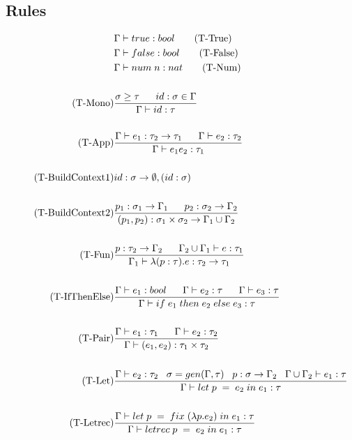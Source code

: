 \documentclass[10pt,a4paper,draft]{article}
\begin{document}
\begin{flushleft}
\subsection{Rules}
\begin{align*}
&\Gamma \vdash true : bool \tag{T-True} \\
&\Gamma \vdash false : bool \tag{T-False} \\
&\Gamma \vdash num \; n : nat \tag{T-Num} \\ \\
\tag{T-Mono}
&\frac{\sigma \geq \tau \longspace id:\sigma \in \Gamma}{\Gamma \vdash id:\tau}\\ \\
\tag{T-App}
&\frac{\Gamma \vdash e_{1}:\tau_{2} \rightarrow \tau_{1} \longspace \Gamma \vdash e_{2}:\tau_{2}}
{\Gamma \vdash e_{1}e_{2}:\tau_{1}} \\ \\
\tag{T-BuildContext1}
& id:\sigma \rightarrow \emptyset, (id:\sigma) \\ \\
\tag{T-BuildContext2}
&\frac{p_{1}:\sigma_{1} \rightarrow \Gamma_{1} \longspace p_{2}:\sigma_{2}\rightarrow \Gamma_{2}}
{(p_{1},p_{2}):\sigma_{1}\times \sigma_{2} \rightarrow \Gamma_{1}\cup \Gamma_{2}} \\ \\
\tag{T-Fun}
&\frac{p:\tau_{2} \rightarrow \Gamma_{2} \longspace \Gamma_{2} \cup \Gamma_{1} \vdash e:\tau_{1}}
{\Gamma_{1} \vdash \lambda(p:\tau).e:\tau_{2} \rightarrow \tau_{1}} \\ \\
\tag{T-IfThenElse}
&\frac{\Gamma \vdash e_{1}:bool \longspace \Gamma \vdash e_{2}:\tau \longspace \Gamma \vdash e_{3} : \tau}
{\Gamma \vdash if \; e_{1} \; then \; e_{2} \; else \; e_{3} : \tau} \\ \\
\tag{T-Pair}
&\frac{\Gamma \vdash e_{1}:\tau_{1} \longspace \Gamma \vdash e_{2}:\tau_{2}}
{\Gamma \vdash (e_{1},e_{2}) : \tau_{1}\times\tau_{2}} \\ \\
\tag{T-Let}
&\frac{\Gamma \vdash e_{2}:\tau_{2} \;\;\; \sigma=gen(\Gamma,\tau)\;\;\;p:\sigma\rightarrow \Gamma_{2} \;\;\; \Gamma \cup \Gamma_{2} \vdash e_{1}:\tau}
{\Gamma \vdash let\;p\;=\;e_{2}\;in\;e_{1}:\tau} \\ \\
\tag{T-Letrec}
&\frac{\Gamma \vdash let\;p\;=\;fix\;(\lambda p.e_{2})\;in\;e_{1}:\tau}
{\Gamma \vdash letrec\;p\;=\;e_{2}\;in\;e_{1}:\tau} \\ \\

\end{align*}
\end{flushleft}
\end{document}
